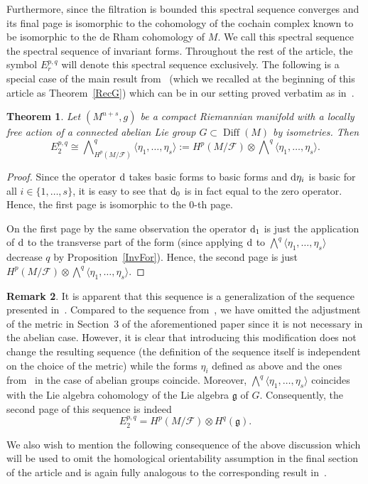 \documentclass[10pt,a4paper]{amsart}
\numberwithin{equation}{section}
\newtheorem{tw}{Theorem}[section]
\theoremstyle{definition}
\newtheorem{rem}[tw]{Remark}
\begin{document}
Furthermore, since the filtration is bounded this spectral sequence converges and its final page is isomorphic to the cohomology of the cochain complex  known to be isomorphic to the de Rham cohomology of $M$. We call this spectral sequence the spectral sequence of invariant forms. Throughout the rest of the article, the symbol $E_{r}^{p,q}$ will denote this spectral sequence exclusively. The following is a special case of the main result from~\cite{My4} (which we recalled at the beginning of this article as Theorem~\ref{RecG}) which can be in our setting proved verbatim as in~\cite{My3}.
\begin{tw}%
Let $(M^{n+s},g)$ be a compact Riemannian manifold with a locally free action of a connected abelian Lie group $G\subset \operatorname{Diff}(M)$ by isometries. Then
\[E_2^{p,q}\cong \bigwedge\nolimits_{H^{p}(M\slash\mathcal{F})}^q\langle\eta_1,\dots,\eta_s\rangle:=H^{p}(M\slash\mathcal{F})\otimes\bigwedge\nolimits^q\langle\eta_1,\dots,\eta_s\rangle.\]
\end{tw}

\begin{proof} Since the operator ${\rm d}$ takes basic forms to basic forms and ${\rm d}\eta_i$ is basic for all $i\in\{1,\dots,s\}$, it is easy to see that ${\rm d}_0$ is in fact equal to the zero operator. Hence, the first page is isomorphic to the $0$-th page.

On the first page by the same observation the operator ${\rm d}_1$ is just the application of ${\rm d}$ to the transverse part of the form (since applying ${\rm d}$ to $\bigwedge ^q\langle\eta_1,\dots,\eta_s\rangle$ decrease $q$ by Proposition~\ref{InvFor}). Hence, the second page is just $H^{p}(M\slash\mathcal{F})\otimes\bigwedge ^q\langle\eta_1,\dots,\eta_s\rangle$.
\end{proof}

\begin{rem} It is apparent that this sequence is a generalization of the sequence presented in~\cite{My3}. Compared to the sequence from~\cite{My4}, we have omitted the adjustment of the metric in Section~3 of the aforementioned paper since it is not necessary in the abelian case. However, it is clear that introducing this modification does not change the resulting sequence (the definition of the sequence itself is independent on the choice of the metric) while the forms $\eta_i$ defined as above and the ones from~\cite{My4} in the case of abelian groups coincide. Moreover, $\bigwedge^q\langle\eta_1,\dots,\eta_s\rangle$ coincides with the Lie algebra cohomology of the Lie algebra $\mathfrak{g}$ of $G$. Consequently, the second page of this sequence is indeed
\[E^{p,q}_2=H^p(M\slash\mathcal{F})\otimes H^{q}(\mathfrak{g}).\]
\end{rem}
We also wish to mention the following consequence of the above discussion which will be used to omit the homological orientability assumption in the final section of the article and is again fully analogous to the corresponding result in~\cite{My3}.
\end{document}
